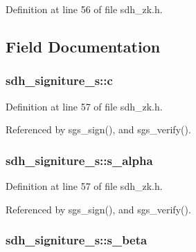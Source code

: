 Definition at line 56 of file sdh\-\_\-zk.\-h.



\subsection{Field Documentation}
\hypertarget{structsdh__signiture__s_a4157eba2c6a864442f4e9aca77d86789}{
\subsubsection[{c}]{ sdh\-\_\-signiture\-\_\-s\-::c}}\label{structsdh__signiture__s_a4157eba2c6a864442f4e9aca77d86789}


Definition at line 57 of file sdh\-\_\-zk.\-h.



Referenced by sgs\-\_\-sign(), and sgs\-\_\-verify().

\hypertarget{structsdh__signiture__s_af9205d46759214e39aae7e340bedd990}{
\subsubsection[{s\-\_\-alpha}]{ sdh\-\_\-signiture\-\_\-s\-::s\-\_\-alpha}}\label{structsdh__signiture__s_af9205d46759214e39aae7e340bedd990}


Definition at line 57 of file sdh\-\_\-zk.\-h.



Referenced by sgs\-\_\-sign(), and sgs\-\_\-verify().

\hypertarget{structsdh__signiture__s_a113226e9c2a5ef9308e5763705816b6b}{
\subsubsection[{s\-\_\-beta}]{ sdh\-\_\-signiture\-\_\-s\-::s\-\_\-beta}}\label{structsdh__signiture__s_a113226e9c2a5ef9308e5763705816b6b}


